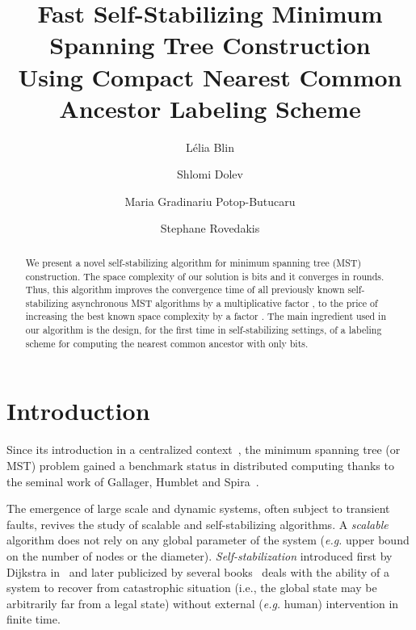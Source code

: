 \documentclass[11pt,a4paper]{article}
\begin{document}
\title{Fast Self-Stabilizing Minimum Spanning Tree Construction\\
 \small{Using Compact Nearest Common Ancestor Labeling Scheme}}



\author{
L{\'e}lia Blin
\and
Shlomi Dolev
\and
Maria Gradinariu Potop-Butucaru
\and
Stephane Rovedakis
}





\maketitle


\begin{abstract}
We present a novel self-stabilizing algorithm for minimum spanning tree (MST) construction. 
The space complexity of our solution is  bits and it converges in  rounds. 
Thus, this algorithm improves the convergence time of all previously known self-stabilizing asynchronous MST algorithms by 
a multiplicative factor , to the price of increasing the best known space complexity by a factor . 
The main ingredient used in our algorithm is the design, for the first time in self-stabilizing settings, of a labeling scheme  
for computing the nearest common ancestor with only  bits. 
\end{abstract}



\section{Introduction}
\label{sec:intro}
Since its introduction in a centralized context~\cite{Prim57,Kruskal56}, the minimum spanning tree (or MST) problem gained a 
benchmark status in distributed computing thanks to the seminal work of Gallager, Humblet and Spira~\cite{GallagerHS83}.  

The emergence of large scale and dynamic systems, often subject to transient faults, revives the study of scalable and self-stabilizing algorithms.
A \emph{scalable} algorithm does not rely on any global parameter of the system (\emph{e.g.} upper bound on the  number of nodes or the diameter). 
\emph{Self-stabilization} introduced first by Dijkstra in~\cite{D74j} and later publicized by several books~\cite{Dolev00,Tel94} deals 
with the ability of a system to recover from catastrophic situation (i.e., the global state may be arbitrarily far from a legal state)
without external (\emph{e.g.} human) intervention in finite time.
\end{document}
